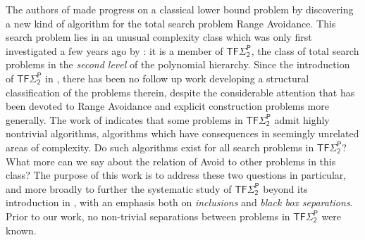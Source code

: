 \documentclass[11pt]{article}
\newcommand{\todo}[1]{\textcolor{red}{TODO: #1}}
\begin{document}
The authors of \cite{CHR,Li} made progress on a classical lower bound problem by discovering a new kind of algorithm for the total search problem Range Avoidance. This search problem lies in an unusual complexity class which was only first investigated a few years ago by \cite{KKMP}: it is a member of $\mathsf{TF\Sigma_2^P}$, the class of total search problems in the \emph{second level} of the polynomial hierarchy. Since the introduction of $\mathsf{TF\Sigma_2^P}$ in \cite{KKMP}, there has been no follow up work developing a structural classification of the problems therein, despite the considerable attention that has been devoted to Range Avoidance \cite{Korten, CHR, time-space, hard-partial, io,karthik,hardness-lwe,low-depth-avoid} and explicit construction problems more generally. The work of \cite{CHR,Li} indicates that some problems in $ \mathsf{TF\Sigma_2^P}$ admit highly nontrivial algorithms, algorithms which have consequences in seemingly unrelated areas of complexity. Do such algorithms exist for all search problems in $\mathsf{TF\Sigma_2^P}$? What more can we say about the relation of Avoid to other problems in this class? The purpose of this work is to address these two questions in particular, and more broadly to further the systematic study of $\mathsf{TF\Sigma_2^P}$ beyond its introduction in \cite{KKMP}, with an emphasis both on \emph{inclusions} and \emph{black box separations}. Prior to our work, no non-trivial separations between problems in $\mathsf{TF\Sigma_2^P}$ were known.

\end{document}
